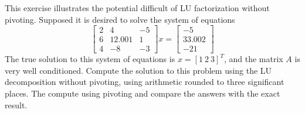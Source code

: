 \documentclass{homework}
\begin{document}
\begin{problem}[5-4]
 This exercise illustrates the potential difficult of LU factorization without pivoting. Supposed it is desired to solve the system of equations
 \[
   \begin{bmatrix}
     2 & 4 & -5 \\
     6 & 12.001 & 1 \\
     4 & -8 & -3
   \end{bmatrix}x=
   \begin{bmatrix}
     -5 \\
     33.002 \\
     -21
   \end{bmatrix}
 \]
 The true solution to this system of equations is $x = [1\ 2\ 3]^T$, and the matrix $A$ is very well conditioned. Compute the solution to this problem using the LU decomposition without pivoting, using arithmetic rounded to three significant places. The compute using pivoting and compare the answers with the exact result.
\end{problem}
\end{document}
